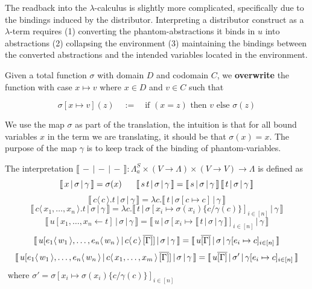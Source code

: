 \documentclass[runningheads]{llncs}
\let\vec\relax
\newcommand\defn{\textbf}
\newcommand{\FALC}{\Lambda^{S}_{a}}
\newcommand{\abs}[2]{\lambda #1 . #2}
\newcommand{\app}[2]{#1 \, #2}
\newcommand{\fake}[3]{#1 \langle \, #2 \, \rangle . #3}
\newcommand{\share}[3]{#1 [#2 \leftarrow #3]}
\newcommand{\dist}[5]{#1 [ #2 \, \vert \, \fakedist{#4}{#5} \, #3 ]}
\newcommand{\fakedist}[2]{#1 \langle \, #2 \, \rangle}
\newcommand{\sub}[3]{#1 \{ #2 / #3 \}}
\newcommand{\readbackwmap}[3]{\llbracket \, #1 \, \vert \, #2 \, \vert \, #3  \, \rrbracket }
\begin{document}
The readback into the $\lambda$-calculus is slightly more complicated, specifically due to the bindings induced by the distributor. Interpreting a distributor construct as a $\lambda$-term requires (1) converting the phantom-abstractions it binds in $u$ into abstractions (2) collapsing the environment (3) maintaining the bindings between the converted abstractions and the intended variables located in the environment.


\begin{definition}
Given a total function $\sigma$ with domain $D$ and codomain $C$, we \defn{overwrite} the function with case $x \mapsto v$ where $x \in D$ and $v \in C$ such that


\[\sigma [x \mapsto v] (z) \quad := \quad \text{if } (x = z) \text{ then } v \text{ else } \sigma(z)  \]

\end{definition}

We use the map $\sigma$ as part of the translation, the intuition is that for all bound variables $x$ in the term we are translating, it should be that $\sigma(x) = x$. The purpose of the map $\gamma$ is to keep track of the binding of phantom-variables.

\begin{definition}
\label{def:readback}
The interpretation $\readbackwmap{-}{-}{-} : \FALC \times (V \rightarrow \Lambda) \times (V \rightarrow V) \rightarrow \Lambda$ is defined as
\begingroup
\allowdisplaybreaks
	\[ \readbackwmap{x}{\sigma}{\gamma} = \sigma(x) \hspace{0.6cm}
	\readbackwmap{\app{s}{t}}{\sigma}{\gamma} = \app{\readbackwmap{s}{\sigma}{\gamma}}{\readbackwmap{t}{\sigma}{\gamma}} \]
	\[ \readbackwmap{\fake{c}{c}{t}}{\sigma}{\gamma} = \abs{c}{\readbackwmap{t}{\sigma[c \mapsto c]}{\gamma}} \]
	\[ \readbackwmap{\fake{c}{x_{1}, \dots, x_{n}}{t}}{\sigma}{\gamma} = \abs{c}{\readbackwmap{t}{\sigma[x_{i} \mapsto \sigma(x_{i}) \sub{}{c}{\gamma(c)}]_{i \in [n]}}{\gamma}} \]
	\[ \readbackwmap{\share{u}{x_{1}, \dots, x_{n}}{t}}{\sigma}{\gamma} = \readbackwmap{u}{\sigma[x_{i} \mapsto \readbackwmap{t}{\sigma}{\gamma}]_{i \in [n]}}{\gamma}  \]
	\[ \readbackwmap{\dist{u}{\fakedist{e_{1}}{\vec{w_{1}}}, \dots, \fakedist{e_{n}}{\vec{w_{n}}}}{\overline{[\Gamma]}}{c}{c}}{\sigma}{\gamma} = \readbackwmap{u \overline{[\Gamma]}}{\sigma}{\gamma[e_{i} \mapsto c]_{i \in [n]}} \]
	\[ \readbackwmap{\dist{u}{\fakedist{e_{1}}{\vec{w_{1}}}, \dots, \fakedist{e_{n}}{\vec{w_{n}}}}{\overline{[\Gamma]}}{c}{x_{1}, \dots, x_{m}}}{\sigma}{\gamma} = \readbackwmap{u \overline{[\Gamma]}}{\sigma'}{\gamma[e_{i} \mapsto c]_{i \in [n]}} \]
	  $\text{ where } \sigma' = \sigma[x_{i} \mapsto \sigma(x_{i}) \sub{}{c}{\gamma(c)}]_{i \in [n]}$
\endgroup

\end{definition}
\end{document}
